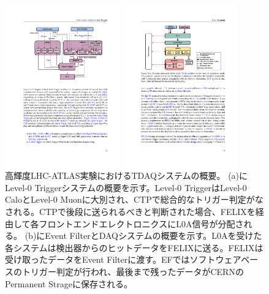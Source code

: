 \begin{figure}
\begin{minipage}[b]{.5\linewidth}
\centering
\includegraphics[height=7cm]{fig/Intro/Phase2_L0trigger.pdf}
\end{minipage}%
\begin{minipage}[b]{.5\linewidth}
\centering
\includegraphics[height=7cm]{fig/Intro/Phase2_EF.pdf}
\end{minipage}%
\caption[高輝度LHC-ATLAS実験におけるTDAQシステムの概要]{高輝度LHC-ATLAS実験におけるTDAQシステムの概要\cite{tdr_phase2tdaq_2017020}。 (a)にLevel-0 Triggerシステムの概要を示す。Level-0 TriggerはLevel-0 CaloとLevel-0 Muonに大別され、CTPで総合的なトリガー判定がなされる。CTPで後段に送られるべきと判断された場合、FELIXを経由して各フロントエンドエレクトロニクスにL0A信号が分配される。 (b)にEvent FilterとDAQシステムの概要を示す。L0Aを受けた各システムは検出器からのヒットデータをFELIXに送る。FELIXは受け取ったデータをEvent Filterに渡す。EFではソフトウェアベースのトリガー判定が行われ、最後まで残ったデータがCERNのPermanent Strageに保存される。}
\label{Phase2_TDAQ}
\end{figure}

